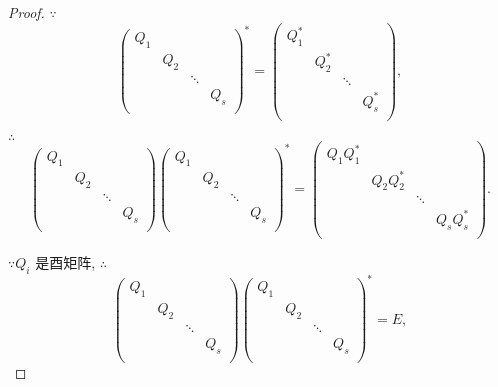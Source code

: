 \documentclass{ctexart}
\begin{document}
\begin{proof}
    $\because$
    \[\begin{pmatrix}
        Q_1 \\
        & Q_2 \\
        && \ddots \\
        &&& Q_s \\
    \end{pmatrix}^*=\begin{pmatrix}
        Q_1^* \\
        & Q_2^* \\
        && \ddots \\
        &&& Q_s^* \\
    \end{pmatrix},\]

    $\therefore$
    \[\begin{pmatrix}
        Q_1 \\
        & Q_2 \\
        && \ddots \\
        &&& Q_s \\
    \end{pmatrix}\begin{pmatrix}
        Q_1 \\
        & Q_2 \\
        && \ddots \\
        &&& Q_s \\
    \end{pmatrix}^*=\begin{pmatrix}
        Q_1Q_1^* \\
        & Q_2Q_2^* \\
        && \ddots \\
        &&& Q_sQ_s^* \\
    \end{pmatrix}.\]

    $\because Q_i$ 是酉矩阵, $\therefore$
    \[\begin{pmatrix}
        Q_1 \\
        & Q_2 \\
        && \ddots \\
        &&& Q_s \\
    \end{pmatrix}\begin{pmatrix}
        Q_1 \\
        & Q_2 \\
        && \ddots \\
        &&& Q_s \\
    \end{pmatrix}^*=E,\]


\end{proof}
\end{document}
